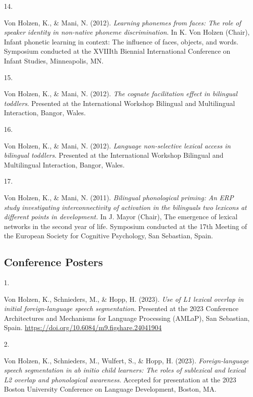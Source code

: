 \documentclass[10pt,a4paper,]{article}
\newlength{\cslhangindent}
\newlength{\csllabelwidth}
\newcommand{\CSLLeftMargin}[1]{\parbox[t]{\csllabelwidth}{\hfill #1~}}
\newcommand{\CSLRightInline}[1]{\parbox[t]{\linewidth - \cslhangindent - \csllabelwidth}{#1}\vspace{0.8ex}}
\begin{document}
\leavevmode{}%
\CSLLeftMargin{14. }%
\CSLRightInline{Von Holzen, K., \& Mani, N. (2012). \emph{Learning
phonemes from faces: The role of speaker identity in non-native phoneme
discrimination}. In K. Von Holzen (Chair), Infant phonetic learning in
context: The influence of faces, objects, and words. Symposium conducted
at the XVIIIth Biennial International Conference on Infant Studies,
Minneapolis, MN.}

\leavevmode{}%
\CSLLeftMargin{15. }%
\CSLRightInline{Von Holzen, K., \& Mani, N. (2012). \emph{The cognate
facilitation effect in bilingual toddlers}. Presented at the
International Workshop Bilingual and Multilingual Interaction, Bangor,
Wales.}

\leavevmode{}%
\CSLLeftMargin{16. }%
\CSLRightInline{Von Holzen, K., \& Mani, N. (2012). \emph{Language
non-selective lexical access in bilingual toddlers}. Presented at the
International Workshop Bilingual and Multilingual Interaction, Bangor,
Wales.}

\leavevmode{}%
\CSLLeftMargin{17. }%
\CSLRightInline{Von Holzen, K., \& Mani, N. (2011). \emph{Bilingual
phonological priming: An ERP study investigating interconnectivity of
activation in the bilinguals two lexicons at different points in
development.} In J. Mayor (Chair), The emergence of lexical networks in
the second year of life. Symposium conducted at the 17th Meeting of the
European Society for Cognitive Psychology, San Sebastian, Spain.}

\hypertarget{conference-posters}{%
\subsection{Conference Posters}\label{conference-posters}}

\hypertarget{bibliography}{}
\leavevmode{}%
\CSLLeftMargin{1. }%
\CSLRightInline{Von Holzen, K., Schnieders, M., \& Hopp, H. (2023).
\emph{Use of L1 lexical overlap in initial foreign-language speech
segmentation}. Presented at the 2023 Conference Architectures and
Mechanisms for Language Processing (AMLaP), San Sebastian, Spain.
\url{https://doi.org/10.6084/m9.figshare.24041904}}

\leavevmode{}%
\CSLLeftMargin{2. }%
\CSLRightInline{Von Holzen, K., Schnieders, M., Wulfert, S., \& Hopp, H.
(2023). \emph{Foreign-language speech segmentation in ab initio child
learners: The roles of sublexical and lexical L2 overlap and
phonological awareness}. Accepted for presentation at the 2023 Boston
University Conference on Language Development, Boston, MA.}
\end{document}
